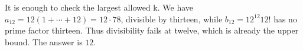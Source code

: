 It is enough to check the largest allowed k. We have $a_{12}=12(1+\cdots+12)=12\cdot78$, divisible by thirteen, while $b_{12}=12^{12}12!$ has no prime factor thirteen. Thus divisibility fails at twelve, which is already the upper bound. The answer is $\boxed{12}$.
